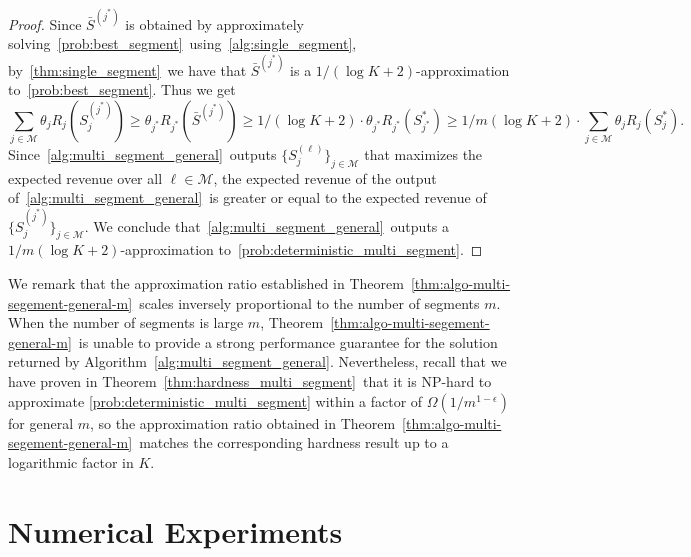 \documentclass[msom,non-blindrev]{informs3} %
\theoremstyle{definition}
\begin{document}
\begin{proof}
Since $\bar{S}^{(j^*)}$ is obtained by approximately solving~\eqref{prob:best_segment}~using~\cref{alg:single_segment}, by~\cref{thm:single_segment}~we have that $\bar{S}^{(j^*)}$ is a $1/(\log K+2)$-approximation to~\eqref{prob:best_segment}. Thus we get
\begin{equation*}
\sum_{j\in\mathcal{M}}\theta_jR_j(S_j^{(j^*)})\geq \theta_{j^*}R_{j^*}(\bar{S}^{(j^*)})\geq 1/(\log K+2)\cdot \theta_{j^*}R_{j^*}(S_{j^*}^*)\geq1/m(\log K+2)\cdot\sum_{j\in\mathcal{M}}\theta_jR_j(S_j^*).
\end{equation*}
Since~\cref{alg:multi_segment_general}~outputs $\{S_j^{(\ell)}\}_{j\in\mathcal{M}}$ that maximizes the expected revenue over all $\ell\in\mathcal{M}$, the expected revenue of the output of~\cref{alg:multi_segment_general}~is greater or equal to the expected revenue of $\{S_j^{(j^*)}\}_{j\in\mathcal{M}}$. We conclude that~\cref{alg:multi_segment_general}~outputs a $1/m(\log K+2)$-approximation to~\eqref{prob:deterministic_multi_segment}.
\end{proof}

{  We remark that the approximation ratio established in Theorem~\ref{thm:algo-multi-segement-general-m}~scales inversely proportional to the number of segments $m$. When the number of segments is large $m$, Theorem~\ref{thm:algo-multi-segement-general-m}~is unable to provide a strong performance guarantee for the solution returned by Algorithm~\ref{alg:multi_segment_general}. Nevertheless, recall that we have proven in Theorem~\ref{thm:hardness_multi_segment}~that it is NP-hard to approximate \eqref{prob:deterministic_multi_segment} within a factor of $\Omega(1/m^{1-\epsilon})$ for general $m$, so the approximation ratio obtained in Theorem~\ref{thm:algo-multi-segement-general-m}~matches the corresponding hardness result up to a logarithmic factor in $K$. }


\section{Numerical Experiments}\label{sec:numerical}

\end{document}
